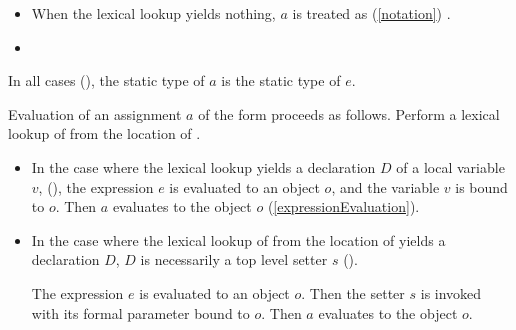 \documentclass[makeidx]{article}
\begin{document}
{\begin{itemize}
  If $D$ is the declaration of a static setter in class or mixin $C$
  then $a$ is treated as
  (\ref{notation})
  the assignment .


  Otherwise, a  occurs,
  unless the static type of $e$ is assignable to the parameter type of $D$.
\item
  When the lexical lookup yields nothing,
  $a$ is treated as
  (\ref{notation})
  .

\item
\end{itemize}

\LMHash{}%
In all cases
(),
the static type of $a$ is the static type of $e$.

\LMHash{}%
Evaluation of an assignment $a$ of the form 
proceeds as follows.
Perform a lexical lookup of \code{\id=} from the location of \id.

\begin{itemize}
\item
  In the case where the lexical lookup yields
  a declaration $D$ of a local variable $v$,
  (),
  the expression $e$ is evaluated to an object $o$,
  and the variable $v$ is bound to $o$.
  Then $a$ evaluates to the object $o$
  (\ref{expressionEvaluation}).
\item
  In the case where the lexical lookup of \code{\id=}
  from the location of \id{}
  yields a declaration $D$,
  $D$ is necessarily a top level setter $s$
  ().

  The expression $e$ is evaluated to an object $o$.
  Then the setter $s$ is invoked
  with its formal parameter bound to $o$.
  Then $a$ evaluates to the object $o$.


\end{itemize}}
\end{document}
